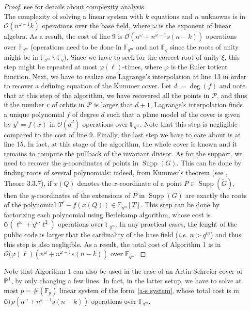 \documentclass[10pt]{article}
\theoremstyle{definition}
\theoremstyle{definition}
\theoremstyle{definition}
\newcommand{\PP}{\mathbb{P}}
\newcommand{\calO}{\mathcal{O}}
\newcommand{\Fqm}{\mathbb{F}_{q^m}}
\newcommand{\Fq}{\mathbb{F}_q}
\newcommand{\w}{\omega}
\newcommand{\PR}{\mathcal{P}}
\newcommand{\Supp}{\operatorname{Supp}}
\begin{document}
\begin{proof} see \cite{CF} for details about complexity analysis. \\
The complexity of solving a linear system with $k$ equations and $n$ unknowns is in $\calO(n^{\w-1}k)$ operations over the base field, where $\w$ is the exponent of linear algebra. As a result, the cost of line 9 is $\calO(n^{\w}+n^{\w-1}s(n-k))$ operations over $\Fqm$ (operations need to be done in $\Fqm$ and not $\Fq$ since the roots of unity might be in $\Fqm \backslash \Fq$). Since we have to seek for the correct root of unity $\xi$, this step might be repeated at most $\varphi(\ell)$-times, where $\varphi$ is the Euler totient function. Next, we have to realize one Lagrange's interpolation at line 13 in order to recover a defining equation of the Kummer cover. Let $d:=\deg(f)$ and note that at this step of the algorithm, we have recovered all the points in $\PR$, and thus if the number $r$ of orbits in $\PR$ is larger that $d+1$, Lagrange's interpolation finds a unique polynomial $f$ of degree $d$ such that a plane model of the cover is given by $y^{\ell}=f(x)$ in $\calO(d^2)$ operations over $\Fqm$. Note that this step is negligible compared to the cost of line 9. Finally, the last step we have to care about is at line 15. In fact, at this stage of the algorithm, the whole cover is known and it remains to compute the pullback of the invariant divisor. As for the support, we need to recover the $y$-coordinates of points in $\Supp(G)$. This can be done by finding roots of several polynomials: indeed, from Kummer's theorem (see \cite{Sti}, Theore 3.3.7), if $x(Q)$ denotes the $x$-coordinate of a point $P \in \Supp(\tilde{G})$, then the $y$-coordinates of the extensions of $P$ in $\Supp(G)$ are exactly the roots of the polynomial $T^{\ell}-f(x(Q)) \in \Fqm[T]$. This step can be done by factorizing each polynomial using Berlekamp algorithm, whose cost is $\calO(\ell^{\w}+q^m\ell^{2})$ operations over $\Fqm$. In any practical cases, the lenght of the public code is larger that the cardinality of the base field (\textit{i.e.} $n > q^m$) and thus this step is also negligible. As a result, the total cost of Algorithm 1 is in $\calO(\varphi(\ell)(n^{\w}+n^{\w-1}s(n-k))$ over $\Fqm$.
\end{proof}

Note that Algorithm 1 can also be used in the case of an Artin-Schreier cover of $\PP^1$, by only changing a few lines. In fact, in the latter setup, we have to solve at most $p = \#(\mathbb{F}_p)$ linear system of the form~\eqref{a-s system}, whose total cost is in $\calO(p(n^{\w}+n^{\w-1}s(n-k))$ operations over $\Fqm$.
\end{document}
